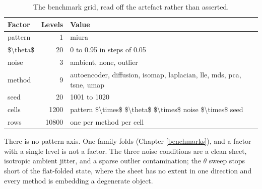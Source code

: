 \documentclass[
  british,
  a4paper,
]{book}
\newenvironment{Shaded}{\begin{snugshade}}{\end{snugshade}}
\newcommand{\AttributeTok}[1]{\textcolor[rgb]{0.13,0.29,0.53}{#1}}
\newcommand{\FunctionTok}[1]{\textcolor[rgb]{0.13,0.29,0.53}{\textbf{#1}}}
\newcommand{\NormalTok}[1]{#1}
\newcommand{\SpecialCharTok}[1]{\textcolor[rgb]{0.81,0.36,0.00}{\textbf{#1}}}
\newcommand{\StringTok}[1]{\textcolor[rgb]{0.31,0.60,0.02}{#1}}
\newcounter{none} %
\begin{document}
\begin{Shaded}
\end{Shaded}

\begin{table}

\caption{\label{tab:results-design}The benchmark grid, read off the artefact rather than asserted.}
\centering
\begin{tabular}[t]{l|r|l}
\hline
Factor & Levels & Value\\
\hline
pattern & 1 & miura\\
\hline
\$\textbackslash{}theta\$ & 20 & 0 to 0.95 in steps of 0.05\\
\hline
noise & 3 & ambient, none, outlier\\
\hline
method & 9 & autoencoder, diffusion, isomap, laplacian, lle, mds, pca, tsne, umap\\
\hline
seed & 20 & 1001 to 1020\\
\hline
cells & 1200 & pattern \$\textbackslash{}times\$ \$\textbackslash{}theta\$ \$\textbackslash{}times\$ noise \$\textbackslash{}times\$ seed\\
\hline
rows & 10800 & one per method per cell\\
\hline
\end{tabular}
\end{table}

There is no pattern axis. One family folds (Chapter \ref{benchmarks}), and a
factor with a single level is not a factor. The three noise conditions are a
clean sheet, isotropic ambient jitter, and a sparse outlier contamination; the
\(\theta\) sweep stops short of the flat-folded state, where the sheet has no
extent in one direction and every method is embedding a degenerate object.
\end{document}
